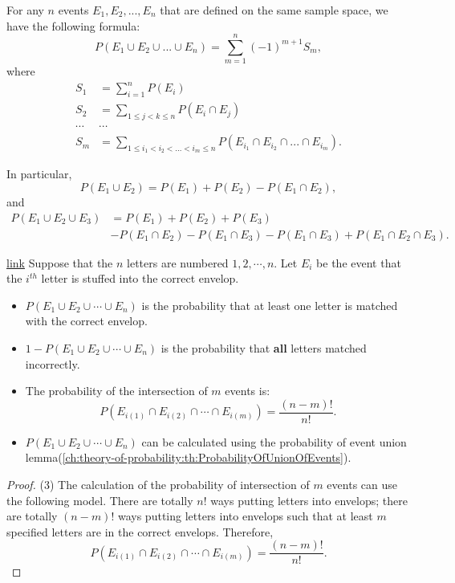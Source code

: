 \begin{refsection}
\begin{lemma}\label{ch:theory-of-probability:th:ProbabilityOfUnionOfEvents}
For any $n$ events $E_1,E_2,...,E_n$ that are defined on the same sample	space, we have the following formula:
$$P(E_1\cup E_2\cup ... \cup E_n) = \sum_{m=1}^n (-1)^{m+1}S_m,$$
where
\begin{align*}
S_1 &= \sum_{i=1}^n P(E_i) \\
S_2 &= \sum_{1\leq j < k \leq n} P(E_i\cap E_j) \\
\cdots & \cdots \\
S_m &= \sum_{1\leq i_1<i_2 < ... <i_m \leq n} P(E_{i_1}\cap E_{i_2}\cap ... \cap E_{i_m}). 
\end{align*}

In particular, 
$$P(E_1\cup E_2) = P(E_1) +　 P(E_2) - P(E_1\cap E_2),$$
and
\begin{align*}
P(E_1\cup E_2 \cup E_3) &= P(E_1) + P(E_2) + P(E_3) \\
& -P(E_1\cap E_2) - P(E_1\cap E_3) - P(E_1\cap E_3) + P(E_1\cap E_2 \cap E_3).
\end{align*}
\end{lemma}


\begin{lemma}\href{https://probabilityandstats.wordpress.com/2010/02/18/the-matching-problem/}{link}
Suppose that the $n$ letters are numbered $1,2, \cdots, n$. Let $E_i$ be the event that the $i^{th}$ letter is stuffed into the correct envelop. 
\begin{itemize}
	\item $P(E_1 \cup E_2 \cup \cdots \cup E_n)$ is the probability that at least one letter is matched with the correct envelop.
	\item $1 -P(E_1 \cup E_2 \cup \cdots \cup E_n) $ is the probability that \textbf{all} letters matched incorrectly.
	\item The probability of the intersection of $m$ events is:
$$ P(E_{i(1)} \cap E_{i(2)} \cap \cdots \cap E_{i(m)})=\frac{(n-m)!}{n!}.$$
	\item $P(E_1 \cup E_2 \cup \cdots \cup E_n)$ can be calculated using the probability of event union lemma(\autoref{ch:theory-of-probability:th:ProbabilityOfUnionOfEvents}).
\end{itemize}
\end{lemma}
\begin{proof}
(3)  The calculation of the probability of intersection of $m$ events can use the following model. There are totally $n!$ ways putting letters into envelops; there are totally $(n-m)!$ ways putting letters into envelops such that at least $m$ specified letters are in the correct envelops. Therefore, 
$$P(E_{i(1)} \cap E_{i(2)} \cap \cdots \cap E_{i(m)})=\frac{(n-m)!}{n!}.$$
\end{proof}



\end{refsection}
